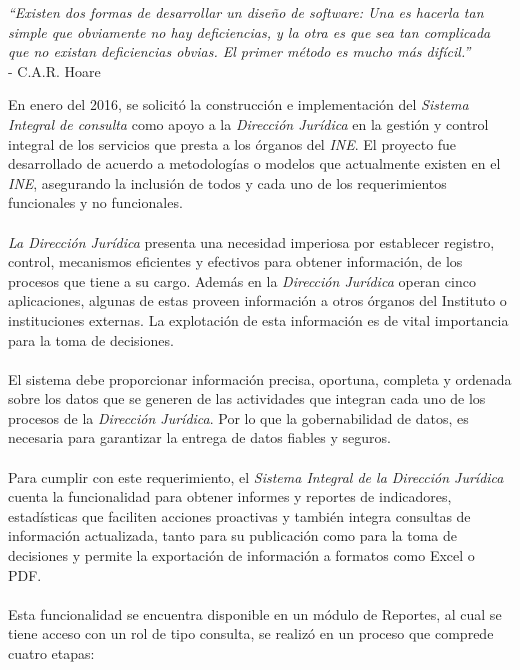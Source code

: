 \documentclass[../reportesINE.tex]{subfiles}
\begin{document}
\begin{center}
\textit{“Existen dos formas de desarrollar un diseño de software: Una es hacerla tan simple que obviamente no hay deficiencias, y la otra es que sea tan complicada que no existan deficiencias obvias. El primer método es mucho más difícil.”} \\
- C.A.R. Hoare
\end{center}

En enero del 2016, se solicitó la construcción e implementación del \textit{Sistema Integral de consulta} como apoyo a la \textit{Dirección Jurídica} en la gestión y control integral de los servicios que presta a los órganos del \textit{INE}. El proyecto fue desarrollado de acuerdo a metodologías o modelos que actualmente existen en el \textit{INE}, asegurando la inclusión de todos y cada uno de los requerimientos funcionales y no funcionales. 
\\ \\
\textit{La Dirección Jurídica} presenta una necesidad imperiosa por establecer registro, control, mecanismos eficientes y efectivos para obtener información, de los procesos que tiene a su cargo. Además en la \textit{Dirección Jurídica} operan cinco aplicaciones, algunas de estas proveen información a otros órganos del Instituto o instituciones externas. La explotación de esta información es de vital importancia para la toma de decisiones. 
\\ \\
El sistema debe proporcionar información precisa, oportuna, completa y ordenada sobre los datos que se generen de las actividades que integran cada uno de los procesos de la \textit{Dirección Jurídica}. Por lo que la gobernabilidad de datos, es necesaria para garantizar la entrega de datos fiables y seguros.
\\ \\
Para cumplir con este requerimiento, el \textit{Sistema Integral de la Dirección Jurídica} cuenta la funcionalidad para obtener informes y reportes de indicadores, estadísticas que faciliten acciones proactivas y también integra consultas de información actualizada, tanto para su publicación como para la toma de decisiones y permite la exportación de información a formatos como Excel o PDF. 
\\ \\
Esta funcionalidad se encuentra disponible en un módulo de Reportes, al cual se tiene acceso con un rol de tipo consulta, se realizó en un proceso que comprede cuatro etapas: 
\end{document}
